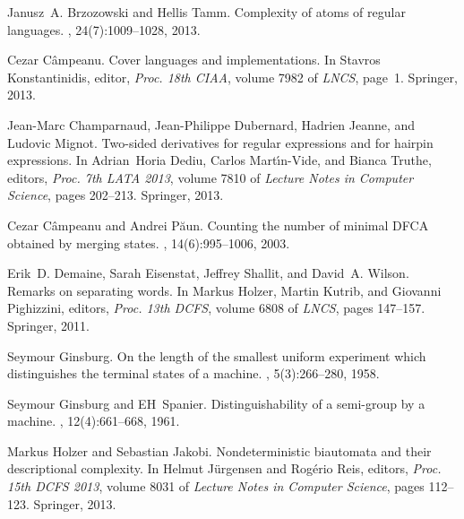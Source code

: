 \documentclass{article}
\begin{document}
\begin{thebibliography}{BBMR14}
Janusz~A. Brzozowski and Hellis Tamm.
\newblock Complexity of atoms of regular languages.
, 24(7):1009--1028, 2013.

Cezar C{\^a}mpeanu.
\newblock Cover languages and implementations.
\newblock In Stavros Konstantinidis, editor, {\em Proc. 18th CIAA}, volume 7982
  of {\em LNCS}, page~1. Springer, 2013.

Jean{-}Marc Champarnaud, Jean{-}Philippe Dubernard, Hadrien Jeanne, and Ludovic
  Mignot.
\newblock Two-sided derivatives for regular expressions and for hairpin
  expressions.
\newblock In Adrian~Horia Dediu, Carlos Mart{\'{\i}}n{-}Vide, and Bianca
  Truthe, editors, {\em Proc. 7th {LATA} 2013}, volume 7810 of {\em Lecture
  Notes in Computer Science}, pages 202--213. Springer, 2013.

Cezar C\^ampeanu and Andrei P\u{a}un.
\newblock Counting the number of minimal {DFCA} obtained by merging states.
, 14(6):995--1006, 2003.

Erik~D. Demaine, Sarah Eisenstat, Jeffrey Shallit, and David~A. Wilson.
\newblock Remarks on separating words.
\newblock In Markus Holzer, Martin Kutrib, and Giovanni Pighizzini, editors,
  {\em Proc. 13th DCFS}, volume 6808 of {\em LNCS}, pages 147--157. Springer,
  2011.

Seymour Ginsburg.
\newblock On the length of the smallest uniform experiment which distinguishes
  the terminal states of a machine.
, 5(3):266--280, 1958.

Seymour Ginsburg and EH~Spanier.
\newblock Distinguishability of a semi-group by a machine.
,
  12(4):661--668, 1961.

Markus Holzer and Sebastian Jakobi.
\newblock Nondeterministic biautomata and their descriptional complexity.
\newblock In Helmut J{\"{u}}rgensen and Rog{\'{e}}rio Reis, editors, {\em Proc.
  15th {DCFS} 2013}, volume 8031 of {\em Lecture Notes in Computer Science},
  pages 112--123. Springer, 2013.


\end{thebibliography}
\end{document}
